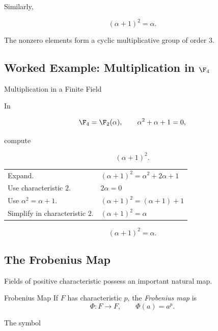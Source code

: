 Similarly,

\[ (\alpha+1)^2=\alpha. \]

The nonzero elements form a cyclic multiplicative group of order \(3\).

\subsection{Worked Example: Multiplication in \(\F_4\)}
\label{subsec:worked-f4}

\begin{workedexamplebox}{Multiplication in a Finite Field}

In

\[ \F_4=\F_2(\alpha),\qquad \alpha^2+\alpha+1=0, \]

compute

\[ (\alpha+1)^2. \]

\begin{tabularx}{\textwidth}{@{}>{\raggedright\arraybackslash}p{}X@{}}
Expand. & \((\alpha+1)^2=\alpha^2+2\alpha+1\)\\
Use characteristic \(2\). & \(2\alpha=0\)\\
Use \(\alpha^2=\alpha+1\). & \((\alpha+1)^2=(\alpha+1)+1\)\\
Simplify in characteristic \(2\). & \((\alpha+1)^2=\alpha\)
\end{tabularx}

\begin{answerbox}
\[ (\alpha+1)^2=\alpha. \]
\end{answerbox}
\end{workedexamplebox}

\subsection{The Frobenius Map}
\label{subsec:frobenius-map}

Fields of positive characteristic possess an important natural map.

\begin{definitionbox}{Frobenius Map}
If \(F\) has characteristic \(p\), the \emph{Frobenius map} is
\[ \Phi:F\to F,\qquad \Phi(a)=a^p. \]
\end{definitionbox}

The symbol

